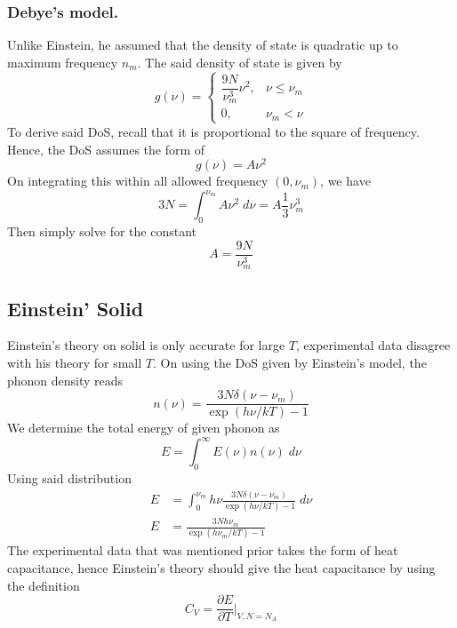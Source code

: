 \documentclass[../../../Main.tex]{subfiles}
\begin{document}
\subsubsection*{Debye's model.} Unlike Einstein, he assumed that the density of state is quadratic up to maximum frequency $n_m$. The said density of state is given by 
\begin{equation*}
    g(\nu)=\begin{cases}
        \dfrac{9N}{\nu_m^3}\nu^2,&\nu\leq\nu_m\\
        0,&\nu_m<\nu
    \end{cases}
\end{equation*}
To derive said DoS, recall that it is proportional to the square of frequency. Hence, the DoS assumes the form of 
\begin{equation*}
    g(\nu)=A\nu^2
\end{equation*}
On integrating this within all allowed frequency $(0,\nu_m)$, we have 
\begin{equation*}
    3N=\int_{0}^{\nu_m}A\nu^2\;d\nu=A\frac{1}{3}\nu_m^3
\end{equation*}
Then simply solve for the constant 
\begin{equation*}
    A=\frac{9N}{\nu_m^3}
\end{equation*}

\subsection*{Einstein' Solid}
Einstein's theory on solid is only accurate for large $T$, experimental data disagree with his theory for small $T$. On using the DoS given by Einstein's model, the phonon density reads 
\begin{equation*}
    n(\nu)=\frac{3N\delta(\nu-\nu_m)}{\exp(h\nu/kT)-1}
\end{equation*}
We determine the total energy of given phonon as 
\begin{equation*}
    E=\int_{0}^{\infty}E(\nu)n(\nu)\;d\nu
\end{equation*}
Using said distribution
\begin{align*}
    E&=\int_{0}^{\nu_m}h\nu \frac{3N\delta(\nu-\nu_m)}{\exp(h\nu/kT)-1}\;d\nu\\
    E&=\frac{3Nh\nu_m}{\exp(h\nu_m/kT)-1}
\end{align*}
The experimental data that was mentioned prior takes the form of heat capacitance, hence Einstein's theory should give the heat capacitance by using the definition 
\begin{equation*}
    C_V=\frac{\partial E}{\partial T}\bigg|_{V,N=N_A}
\end{equation*}
\end{document}
